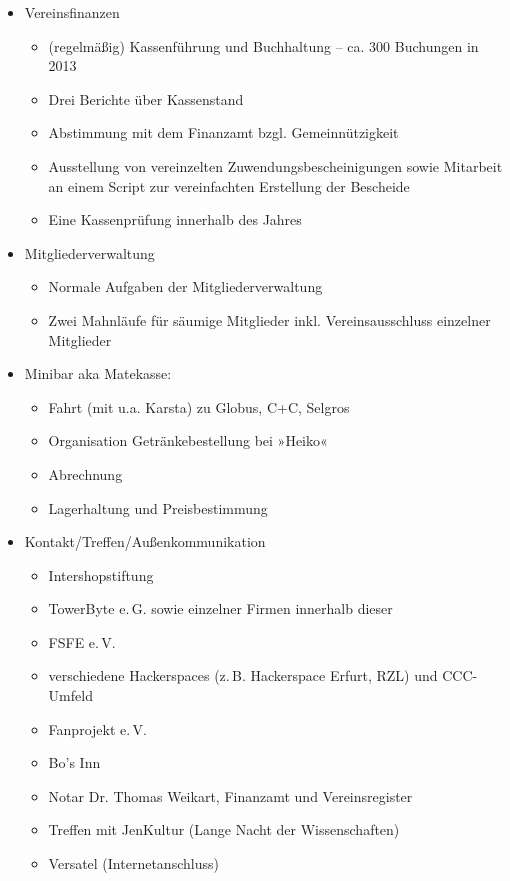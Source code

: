 \documentclass[10pt,DIV16]{scrartcl}
\begin{document}
\begin{itemize}
	\item Vereinsfinanzen
		\begin{itemize}
			\item (regelmäßig) Kassenführung und Buchhaltung --
				  ca. 300 Buchungen in 2013
			\item Drei Berichte über Kassenstand
			\item Abstimmung mit dem Finanzamt bzgl. Gemeinnützigkeit
			\item Ausstellung von vereinzelten Zuwendungsbescheinigungen
				  sowie Mitarbeit an einem Script zur vereinfachten
				  Erstellung der Bescheide
			\item Eine Kassenprüfung innerhalb des Jahres
		\end{itemize}
	\item Mitgliederverwaltung
		\begin{itemize}
			\item Normale Aufgaben der Mitgliederverwaltung
			\item Zwei Mahnläufe für säumige Mitglieder inkl.
				  Vereinsausschluss einzelner Mitglieder
		\end{itemize}
	\item Minibar aka Matekasse:
		\begin{itemize}
			\item Fahrt (mit u.a. Karsta) zu Globus, C+C, Selgros
			\item Organisation Getränkebestellung bei »Heiko«
			\item Abrechnung
			\item Lagerhaltung und Preisbestimmung
		\end{itemize}
	\item Kontakt/Treffen/Außenkommunikation
		\begin{itemize}
			\item Intershopstiftung
			\item TowerByte e.\,G. sowie einzelner Firmen innerhalb dieser
			\item FSFE e.\,V.
			\item verschiedene Hackerspaces (z.\,B. Hackerspace Erfurt, RZL) und CCC-Umfeld
			\item Fanprojekt e.\,V.
			\item Bo's Inn
			\item Notar Dr. Thomas Weikart, Finanzamt und Vereinsregister
            \item Treffen mit JenKultur (Lange Nacht der Wissenschaften)
			\item Versatel (Internetanschluss)

\end{itemize}
\end{itemize}
\end{document}
